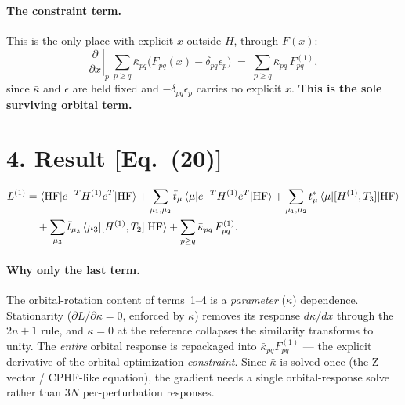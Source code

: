 \documentclass[11pt]{article}
\newcommand{\bra}[1]{\langle #1|}
\newcommand{\ket}[1]{|#1\rangle}
\newcommand{\HF}{\mathrm{HF}}
\newcommand{\pdx}[1]{\left.\frac{\partial #1}{\partial x}\right|_{p}}
\begin{document}
\paragraph{The constraint term.} This is the only place with explicit $x$ outside $H$, through
$F(x)$:
\begin{equation}
\pdx{}\ \sum_{p\ge q}\bar\kappa_{pq}\big(F_{pq}(x)-\delta_{pq}\epsilon_p\big)
 \;=\; \sum_{p\ge q}\bar\kappa_{pq}\,F^{(1)}_{pq},
\end{equation}
since $\bar\kappa$ and $\epsilon$ are held fixed and $-\delta_{pq}\epsilon_p$ carries no explicit
$x$. \textbf{This is the sole surviving orbital term.}

\section*{4. Result [Eq.~(20)]}

\begin{align}
L^{(1)} &= \bra{\HF} e^{-T} H^{(1)} e^{T}\ket{\HF}
+ \sum_{\mu_1,\mu_2}\bar t_\mu\, \bra{\mu} e^{-T} H^{(1)} e^{T}\ket{\HF}
+ \sum_{\mu_1,\mu_2} t^{*}_\mu\, \bra{\mu}[H^{(1)},T_3]\ket{\HF}
\notag\\
&\quad + \sum_{\mu_3}\bar t_{\mu_3}\,\bra{\mu_3}[H^{(1)},T_2]\ket{\HF}
+ \sum_{p\ge q}\bar\kappa_{pq}\,F^{(1)}_{pq}.
\end{align}

\paragraph{Why only the last term.}
The orbital-rotation content of terms~1--4 is a \emph{parameter} ($\kappa$) dependence.
Stationarity ($\partial L/\partial\kappa = 0$, enforced by $\bar\kappa$) removes its response
$d\kappa/dx$ through the $2n{+}1$ rule, and $\kappa=0$ at the reference collapses the similarity
transforms to unity. The \emph{entire} orbital response is repackaged into
$\bar\kappa_{pq}F^{(1)}_{pq}$ --- the explicit derivative of the orbital-optimization
\emph{constraint}. Since $\bar\kappa$ is solved once (the Z-vector / CPHF-like equation), the
gradient needs a single orbital-response solve rather than $3N$ per-perturbation responses.
\end{document}
